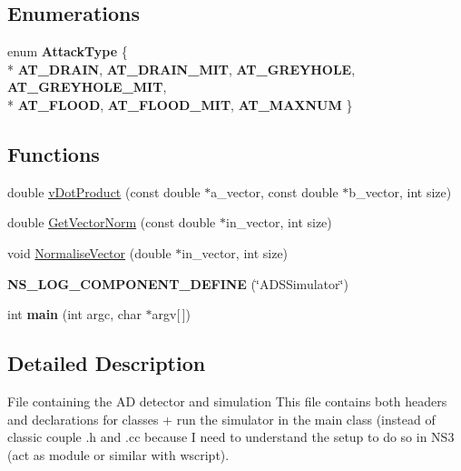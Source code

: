 \subsection*{Enumerations}
\begin{DoxyCompactItemize}
\item 
\hypertarget{ads-simulator_8cc_a904b2f9c8f3951116c343784c59d6afe}{}enum {\bfseries Attack\+Type} \{ \\*
{\bfseries A\+T\+\_\+\+D\+R\+A\+I\+N}, 
{\bfseries A\+T\+\_\+\+D\+R\+A\+I\+N\+\_\+\+M\+I\+T}, 
{\bfseries A\+T\+\_\+\+G\+R\+E\+Y\+H\+O\+L\+E}, 
{\bfseries A\+T\+\_\+\+G\+R\+E\+Y\+H\+O\+L\+E\+\_\+\+M\+I\+T}, 
\\*
{\bfseries A\+T\+\_\+\+F\+L\+O\+O\+D}, 
{\bfseries A\+T\+\_\+\+F\+L\+O\+O\+D\+\_\+\+M\+I\+T}, 
{\bfseries A\+T\+\_\+\+M\+A\+X\+N\+U\+M}
 \}\label{ads-simulator_8cc_a904b2f9c8f3951116c343784c59d6afe}

\end{DoxyCompactItemize}
\subsection*{Functions}
\begin{DoxyCompactItemize}
\item 
double \hyperlink{ads-simulator_8cc_a1c0cb5cd68640a4d58b0bd7391e2326f}{v\+Dot\+Product} (const double $\ast$a\+\_\+vector, const double $\ast$b\+\_\+vector, int size)
\item 
double \hyperlink{ads-simulator_8cc_ab38de828d95e44f3fe95c036258e9598}{Get\+Vector\+Norm} (const double $\ast$in\+\_\+vector, int size)
\item 
void \hyperlink{ads-simulator_8cc_af56665bff891161a0c14f69334ba7dc9}{Normalise\+Vector} (double $\ast$in\+\_\+vector, int size)
\item 
\hypertarget{ads-simulator_8cc_a796f987c7a114e4a30f99022fac1af0d}{}{\bfseries N\+S\+\_\+\+L\+O\+G\+\_\+\+C\+O\+M\+P\+O\+N\+E\+N\+T\+\_\+\+D\+E\+F\+I\+N\+E} (\char`\"{}A\+D\+S\+Simulator\char`\"{})\label{ads-simulator_8cc_a796f987c7a114e4a30f99022fac1af0d}

\item 
\hypertarget{ads-simulator_8cc_a0ddf1224851353fc92bfbff6f499fa97}{}int {\bfseries main} (int argc, char $\ast$argv\mbox{[}$\,$\mbox{]})\label{ads-simulator_8cc_a0ddf1224851353fc92bfbff6f499fa97}

\end{DoxyCompactItemize}


\subsection{Detailed Description}
File containing the A\+D detector and simulation This file contains both headers and declarations for classes + run the simulator in the main class (instead of classic couple .h and .cc because I need to understand the setup to do so in N\+S3 (act as module or similar with wscript). 



